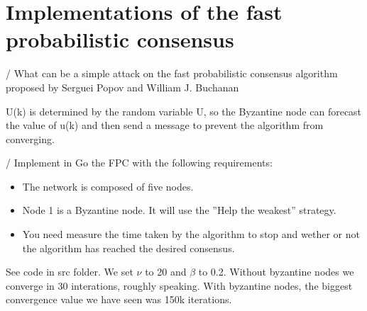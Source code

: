 \documentclass[11pt]{article}
\begin{document}
\vspace{10mm}

\section{Implementations of the fast probabilistic consensus}

\vspace{5mm}

/ What can be a simple attack on the fast probabilistic consensus algorithm proposed
by Serguei Popov and William J. Buchanan

\vspace{5mm}

\noindent U(k) is determined by the random variable U, so the Byzantine node can forecast the value of u(k) and then send a message to prevent the algorithm from converging.

\vspace{5mm}

/ Implement in Go the FPC with the following requirements:
\begin{itemize}
    \item The network is composed of five nodes.
    \item Node 1 is a Byzantine node. It will use the ”Help the weakest” strategy.
    \item You need measure the time taken by the algorithm to stop and wether or not the algorithm has
    reached the desired consensus.
\end{itemize}

\vspace{5mm}

\noindent See code in src folder. We set $\nu$ to 20 and $\beta$ to 0.2. Without byzantine nodes we converge in 30 interations, roughly speaking.
With byzantine nodes, the biggest convergence value we have seen was 150k iterations.



\end{document}
